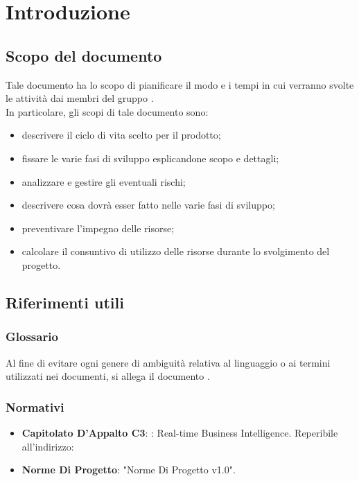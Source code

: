 \section{Introduzione}
	\subsection{Scopo del documento}
		Tale documento ha lo scopo di pianificare il modo e i tempi in cui verranno svolte le attività dai membri del gruppo \groupname{}.\\
		In particolare, gli scopi di tale documento sono:
		\begin{itemize}
			\item descrivere il ciclo di vita scelto per il prodotto;
			\item fissare le varie fasi di sviluppo esplicandone scopo e dettagli;
			\item analizzare e gestire gli eventuali rischi;
			\item descrivere cosa dovrà esser fatto nelle varie fasi di sviluppo;
			\item preventivare l'impegno delle risorse;
			\item calcolare il consuntivo di utilizzo delle risorse durante lo svolgimento del progetto.
		\end{itemize}
	\subsection{Riferimenti utili}
		\subsubsection{Glossario}
		Al fine di evitare ogni genere di ambiguità relativa al linguaggio o ai termini utilizzati nei documenti, si allega il documento .
		\subsubsection{Normativi}
			\begin{itemize}
				\item\textbf{Capitolato D'Appalto C3}: \projectname{}: Real-time Business Intelligence. Reperibile all'indirizzo: 
				\item\textbf{Norme Di Progetto}: "Norme Di Progetto v1.0".
			\end{itemize}
